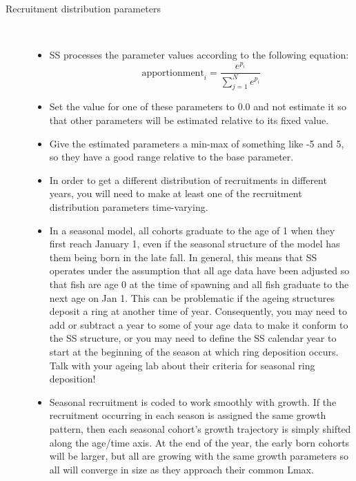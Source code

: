 \begin{description}
	\item[Recruitment distribution parameters]\
	\begin{itemize}
		\item SS processes the parameter values according to the following equation:
		\begin{equation}
		\text{apportionment}_i = \frac{e^{p_i}}{\sum_{j=1}^{N}e^{p_i}}
		\end{equation}
		\item Set the value for one of these parameters to 0.0 and not estimate it so that other parameters will be estimated relative to its fixed value.
		\item Give the estimated parameters a min-max of something like -5 and 5, so they have a good range relative to the base parameter.
		\item In order to get a different distribution of recruitments in different years, you will need to make at least one of the recruitment distribution parameters time-varying.
		\item In a seasonal model, all cohorts graduate to the age of 1 when they first reach January 1, even if the seasonal structure of the model has them being born in the late fall.  In general, this means that SS operates under the assumption that all age data have been adjusted so that fish are age 0 at the time of spawning and all fish graduate to the next age on Jan 1.  This can be problematic if the ageing structures deposit a ring at another time of year.  Consequently, you may need to add or subtract a year to some of your age data to make it conform to the SS structure, or you may need to define the SS calendar year to start at the beginning of the season at which ring deposition occurs.  Talk with your ageing lab about their criteria for seasonal ring deposition!
		\item Seasonal recruitment is coded to work smoothly with growth.  If the recruitment occurring in each season is assigned the same growth pattern, then each seasonal cohort’s growth trajectory is simply shifted along the age/time axis.  At the end of the year, the early born cohorts will be larger, but all are growing with the same growth parameters so all will converge in size as they approach their common Lmax.

\end{itemize}
\end{description}
